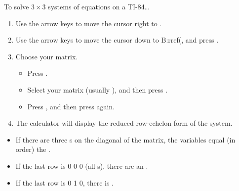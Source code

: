 \begin{center}
\begin{minipage}[t]{1\textwidth}
\begin{myConcept}{To solve $3\times3$ systems of equations on a {\scshape TI-84}\dots}
\begin{enumerate}
        \item Use the arrow keys to move the cursor right to {\ttfamily [MATH]}.
        \item Use the arrow keys to move the cursor down to {\ttfamily B:rref(},
            and press .
        \item Choose your matrix.
            \begin{itemize}
                \item Press  .
                \item Select your matrix (usually {\ttfamily [A]}), 
                    and then press .
                \item Press \myButton{)}, and then press  again.
            \end{itemize}
        \item The calculator will display the reduced row-echelon form 
            of the system.
    \end{enumerate}
    \begin{itemize}
        \item If there are three {}s on the diagonal of the matrix, 
            the variables equal (in order) the 
            .
        \item If the last row is { 0 0 0} (all {}s), 
            there are an .
        \item If the last row is { 0 1 0}, 
            there is .
    \end{itemize}
\end{myConcept}

\end{minipage}
\end{center}
    
    